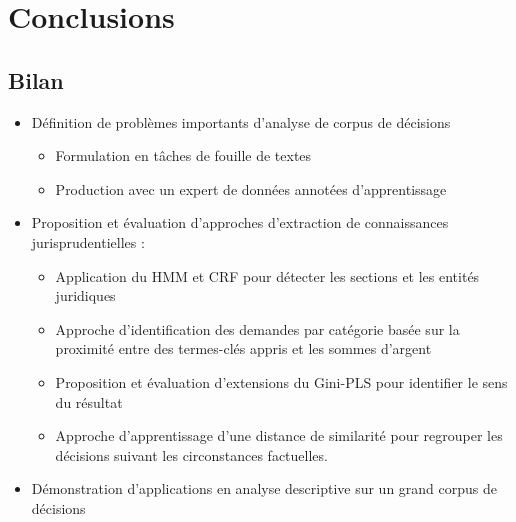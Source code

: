 \section{Conclusions}
\subsection{Bilan}
\begin{frame}[c]{\mysubsectiontitle}	
	\begin{itemize} \scriptsize
		\item Définition de problèmes importants d'analyse de corpus de décisions 
		\begin{itemize} \scriptsize
			\item Formulation en tâches de fouille de textes
			\item Production avec un expert de données annotées d'apprentissage
		\end{itemize}
		\item Proposition et évaluation d'approches d'extraction de connaissances jurisprudentielles :
		\begin{itemize} \scriptsize
			\item Application du HMM  et CRF pour détecter les sections et les entités juridiques
			\item Approche d'identification des demandes par catégorie basée sur la proximité entre des termes-clés appris et les sommes d'argent		
			\item Proposition et évaluation  d'extensions du Gini-PLS pour identifier le sens du résultat
			\item Approche d'apprentissage d'une distance de similarité pour regrouper les décisions suivant les circonstances factuelles.	
		\end{itemize}
	   \item Démonstration d'applications en analyse descriptive sur un grand corpus de décisions
	\end{itemize}
\end{frame}

